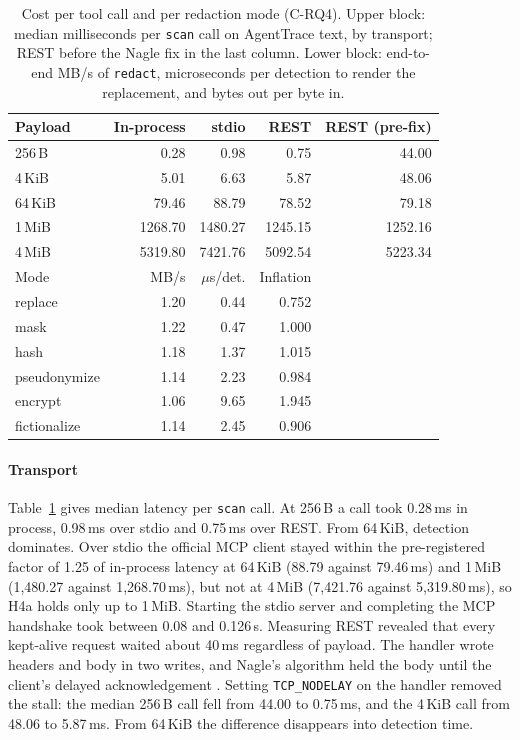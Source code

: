 \documentclass[conference]{IEEEtran}
\begin{document}
\begin{table}[t]
\caption{Cost per tool call and per redaction mode (C-RQ4). Upper block: median milliseconds per \texttt{scan} call on AgentTrace text, by transport; REST before the Nagle fix in the last column. Lower block: end-to-end MB/s of \texttt{redact}, microseconds per detection to render the replacement, and bytes out per byte in.}\label{tab:cost}
\centering\footnotesize\setlength{\tabcolsep}{4pt}
\begin{tabular}{@{}l r r r r@{}}
\toprule
Payload & In-process & stdio & REST & REST (pre-fix) \\
\midrule
256\,B & 0.28 & 0.98 & 0.75 & 44.00 \\
4\,KiB & 5.01 & 6.63 & 5.87 & 48.06 \\
64\,KiB & 79.46 & 88.79 & 78.52 & 79.18 \\
1\,MiB & 1268.70 & 1480.27 & 1245.15 & 1252.16 \\
4\,MiB & 5319.80 & 7421.76 & 5092.54 & 5223.34 \\
\midrule
Mode & MB/s & $\mu$s/det. & Inflation & \\
\midrule
replace & 1.20 & 0.44 & 0.752 & \\
mask & 1.22 & 0.47 & 1.000 & \\
hash & 1.18 & 1.37 & 1.015 & \\
pseudonymize & 1.14 & 2.23 & 0.984 & \\
encrypt & 1.06 & 9.65 & 1.945 & \\
fictionalize & 1.14 & 2.45 & 0.906 & \\
\bottomrule
\end{tabular}
\end{table}


\paragraph{Transport} Table~\ref{tab:cost} gives median latency per \texttt{scan} call. At 256\,B a call took 0.28\,ms in process, 0.98\,ms over stdio and 0.75\,ms over REST. From 64\,KiB, detection dominates. Over stdio the official MCP client stayed within the pre-registered factor of 1.25 of in-process latency at 64\,KiB (88.79 against 79.46\,ms) and 1\,MiB (1,480.27 against 1,268.70\,ms), but not at 4\,MiB (7,421.76 against 5,319.80\,ms), so H4a holds only up to 1\,MiB. Starting the stdio server and completing the MCP handshake took between 0.08 and 0.126\,s. Measuring REST revealed that every kept-alive request waited about 40\,ms regardless of payload. The handler wrote headers and body in two writes, and Nagle's algorithm \cite{rfc896} held the body until the client's delayed acknowledgement \cite{rfc1122}. Setting \texttt{TCP\_NODELAY} on the handler removed the stall: the median 256\,B call fell from 44.00 to 0.75\,ms, and the 4\,KiB call from 48.06 to 5.87\,ms. From 64\,KiB the difference disappears into detection time.
\end{document}
